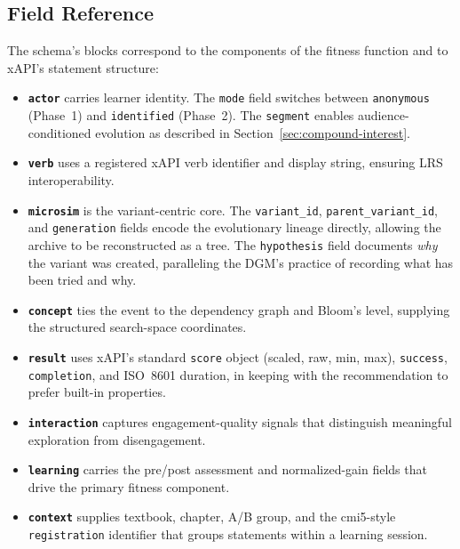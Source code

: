 \subsection{Field Reference}

The schema's blocks correspond to the components of the fitness function and
to xAPI's statement structure:

\begin{itemize}
    \item \textbf{\texttt{actor}} carries learner identity. The \texttt{mode}
          field switches between \texttt{anonymous} (Phase~1) and
          \texttt{identified} (Phase~2). The \texttt{segment} enables
          audience-conditioned evolution as described in
          Section~\ref{sec:compound-interest}.
    \item \textbf{\texttt{verb}} uses a registered xAPI verb identifier and
          display string, ensuring LRS interoperability.
    \item \textbf{\texttt{microsim}} is the variant-centric core. The
          \texttt{variant\_id}, \texttt{parent\_variant\_id}, and
          \texttt{generation} fields encode the evolutionary lineage directly,
          allowing the archive to be reconstructed as a tree. The
          \texttt{hypothesis} field documents \textit{why} the variant was
          created, paralleling the DGM's practice of recording what has been
          tried and why.
    \item \textbf{\texttt{concept}} ties the event to the dependency graph and
          Bloom's level, supplying the structured search-space coordinates.
    \item \textbf{\texttt{result}} uses xAPI's standard \texttt{score} object
          (scaled, raw, min, max), \texttt{success}, \texttt{completion}, and
          ISO~8601 duration, in keeping with the recommendation to prefer
          built-in properties.
    \item \textbf{\texttt{interaction}} captures engagement-quality signals
          that distinguish meaningful exploration from disengagement.
    \item \textbf{\texttt{learning}} carries the pre/post assessment and
          normalized-gain fields that drive the primary fitness component.
    \item \textbf{\texttt{context}} supplies textbook, chapter, A/B group, and
          the cmi5-style \texttt{registration} identifier that groups statements
          within a learning session.
\end{itemize}

